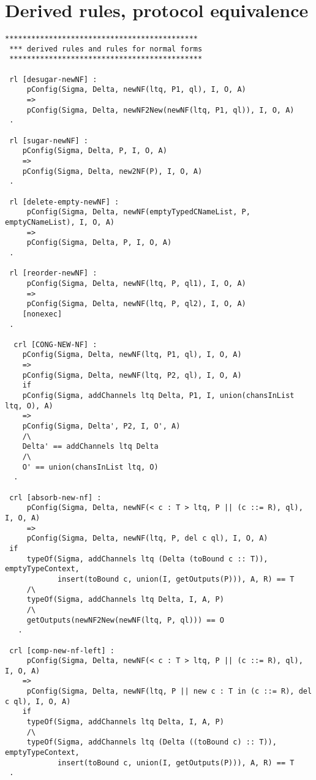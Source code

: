 \section{Derived rules, protocol equivalence}
\begin{lstlisting}
********************************************
 *** derived rules and rules for normal forms
 ********************************************
 
 rl [desugar-newNF] :
     pConfig(Sigma, Delta, newNF(ltq, P1, ql), I, O, A)
     =>
     pConfig(Sigma, Delta, newNF2New(newNF(ltq, P1, ql)), I, O, A) 
 .
     
 rl [sugar-newNF] :
    pConfig(Sigma, Delta, P, I, O, A)
    => 
    pConfig(Sigma, Delta, new2NF(P), I, O, A) 
 .
    
 rl [delete-empty-newNF] :
     pConfig(Sigma, Delta, newNF(emptyTypedCNameList, P, emptyCNameList), I, O, A)
     => 
     pConfig(Sigma, Delta, P, I, O, A) 
 . 
     
 rl [reorder-newNF] :
     pConfig(Sigma, Delta, newNF(ltq, P, ql1), I, O, A)
     =>
     pConfig(Sigma, Delta, newNF(ltq, P, ql2), I, O, A)
    [nonexec]
 . 
        
  crl [CONG-NEW-NF] : 
    pConfig(Sigma, Delta, newNF(ltq, P1, ql), I, O, A) 
    => 
    pConfig(Sigma, Delta, newNF(ltq, P2, ql), I, O, A)
    if
    pConfig(Sigma, addChannels ltq Delta, P1, I, union(chansInList ltq, O), A)
    =>
    pConfig(Sigma, Delta', P2, I, O', A) 
    /\
    Delta' == addChannels ltq Delta
    /\
    O' == union(chansInList ltq, O)
  .    
 
 crl [absorb-new-nf] :
     pConfig(Sigma, Delta, newNF(< c : T > ltq, P || (c ::= R), ql), I, O, A) 
     => 
     pConfig(Sigma, Delta, newNF(ltq, P, del c ql), I, O, A) 
 if
     typeOf(Sigma, addChannels ltq (Delta (toBound c :: T)), emptyTypeContext, 
            insert(toBound c, union(I, getOutputs(P))), A, R) == T 
     /\
     typeOf(Sigma, addChannels ltq Delta, I, A, P)       
     /\ 
     getOutputs(newNF2New(newNF(ltq, P, ql))) == O 
   .
   
 crl [comp-new-nf-left] : 
     pConfig(Sigma, Delta, newNF(< c : T > ltq, P || (c ::= R), ql), I, O, A) 
    => 
     pConfig(Sigma, Delta, newNF(ltq, P || new c : T in (c ::= R), del c ql), I, O, A) 
    if
     typeOf(Sigma, addChannels ltq Delta, I, A, P) 
     /\
     typeOf(Sigma, addChannels ltq (Delta ((toBound c) :: T)), emptyTypeContext, 
            insert(toBound c, union(I, getOutputs(P))), A, R) == T 
 . 
      

\end{lstlisting}
